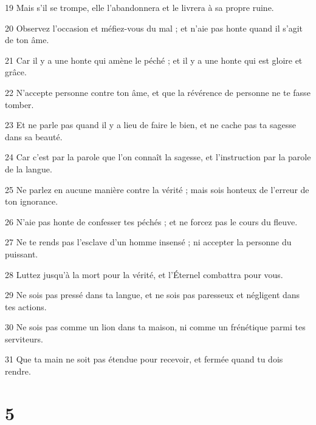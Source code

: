 \par 19 Mais s'il se trompe, elle l'abandonnera et le livrera à sa propre ruine.
\par 20 Observez l'occasion et méfiez-vous du mal ; et n'aie pas honte quand il s'agit de ton âme.
\par 21 Car il y a une honte qui amène le péché ; et il y a une honte qui est gloire et grâce.
\par 22 N'accepte personne contre ton âme, et que la révérence de personne ne te fasse tomber.
\par 23 Et ne parle pas quand il y a lieu de faire le bien, et ne cache pas ta sagesse dans sa beauté.
\par 24 Car c'est par la parole que l'on connaît la sagesse, et l'instruction par la parole de la langue.
\par 25 Ne parlez en aucune manière contre la vérité ; mais sois honteux de l'erreur de ton ignorance.
\par 26 N'aie pas honte de confesser tes péchés ; et ne forcez pas le cours du fleuve.
\par 27 Ne te rends pas l'esclave d'un homme insensé ; ni accepter la personne du puissant.
\par 28 Luttez jusqu'à la mort pour la vérité, et l'Éternel combattra pour vous.
\par 29 Ne sois pas pressé dans ta langue, et ne sois pas paresseux et négligent dans tes actions.
\par 30 Ne sois pas comme un lion dans ta maison, ni comme un frénétique parmi tes serviteurs.
\par 31 Que ta main ne soit pas étendue pour recevoir, et fermée quand tu dois rendre.

\chapter{5}


